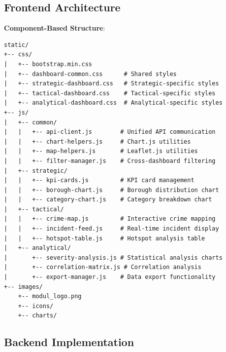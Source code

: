 \documentclass[12pt,a4paper]{article}
\begin{document}
\subsection{Frontend Architecture}

\textbf{Component-Based Structure}:
\begin{verbatim}
static/
+-- css/
|   +-- bootstrap.min.css
|   +-- dashboard-common.css      # Shared styles
|   +-- strategic-dashboard.css   # Strategic-specific styles
|   +-- tactical-dashboard.css    # Tactical-specific styles
|   +-- analytical-dashboard.css  # Analytical-specific styles
+-- js/
|   +-- common/
|   |   +-- api-client.js        # Unified API communication
|   |   +-- chart-helpers.js     # Chart.js utilities
|   |   +-- map-helpers.js       # Leaflet.js utilities
|   |   +-- filter-manager.js    # Cross-dashboard filtering
|   +-- strategic/
|   |   +-- kpi-cards.js         # KPI card management
|   |   +-- borough-chart.js     # Borough distribution chart
|   |   +-- category-chart.js    # Category breakdown chart
|   +-- tactical/
|   |   +-- crime-map.js         # Interactive crime mapping
|   |   +-- incident-feed.js     # Real-time incident display
|   |   +-- hotspot-table.js     # Hotspot analysis table
|   +-- analytical/
|       +-- severity-analysis.js # Statistical analysis charts
|       +-- correlation-matrix.js # Correlation analysis
|       +-- export-manager.js    # Data export functionality
+-- images/
    +-- modul_logo.png
    +-- icons/
    +-- charts/
\end{verbatim}

\subsection{Backend Implementation}
\end{document}
